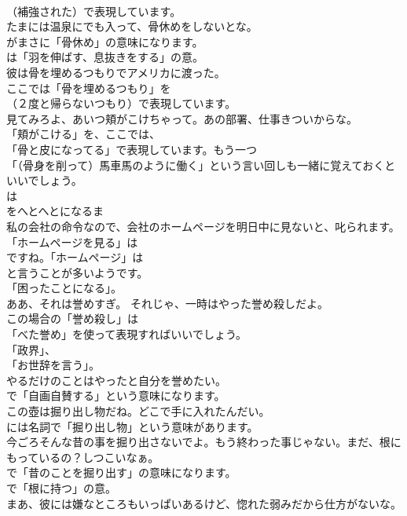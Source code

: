 \documentclass[8pt]{extreport}
\begin{document}
\begin{CJK}{UTF8}{min}
\\	（補強された）で表現しています。	
\\	たまには温泉にでも入って、骨休めをしないとな。 
\\	がまさに「骨休め」の意味になります。
\\	は「羽を伸ばす、息抜きをする」の意。	
\\	彼は骨を埋めるつもりでアメリカに渡った。 
\\	ここでは「骨を埋めるつもり」を
\\	（２度と帰らないつもり）で表現しています。	
\\	見てみろよ、あいつ頬がこけちゃって。あの部署、仕事きついからな。 
\\	「頬がこける」を、ここでは、
\\	「骨と皮になってる」で表現しています。もう一つ
\\	「（骨身を削って）馬車馬のように働く」という言い回しも一緒に覚えておくといいでしょう。
\\	は
\\	をへとへとになるま	
\\	私の会社の命令なので、会社のホームページを明日中に見ないと、叱られます。 
\\	「ホームページを見る」は
\\	ですね。「ホームページ」は
\\	と言うことが多いようです。
\\	「困ったことになる」。	
\\	ああ、それは誉めすぎ。 それじゃ、一時はやった誉め殺しだよ。 
\\	この場合の「誉め殺し」は
\\	「べた誉め」を使って表現すればいいでしょう。
\\	「政界」、
\\	「お世辞を言う」。	
\\	やるだけのことはやったと自分を誉めたい。 
\\	で「自画自賛する」という意味になります。	
\\	この壺は掘り出し物だね。どこで手に入れたんだい。 
\\	には名詞で「掘り出し物」という意味があります。	
\\	今ごろそんな昔の事を掘り出さないでよ。もう終わった事じゃない。まだ、根にもっているの？しつこいなぁ。 
\\	で「昔のことを掘り出す」の意味になります。
\\	で「根に持つ」の意。	
\\	まあ、彼には嫌なところもいっぱいあるけど、惚れた弱みだから仕方がないな。 

\end{CJK}
\end{document}
